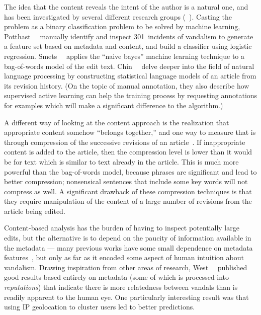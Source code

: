 The idea that the content reveals the intent of the author is a natural
one, and has been investigated by several different research groups
(\eg~\cite{Potthast2008,Smets2008,Druck2008,Itakura2009,Chin2010}).
Casting the problem as a binary classification problem to be solved by
machine learning, Potthast~\etal~\cite{Potthast2008} manually identify
and inspect 301~incidents of vandalism to generate a feature set based
on metadata and content, and build a classifier using
logistic regression.
Smets~\etal~\cite{Smets2008} applies the ``naive bayes'' machine
learning technique to a bag-of-words model of the edit text.
Chin~\etal~\cite{Chin2010} delve deeper into the field of
natural language processing by constructing statistical language
models of an article from its revision history.
(On the topic of manual annotation, they also describe how supervised
active learning can help the training process by requesting
annotations for examples which will make a significant difference to
the algorithm.)

A different way of looking at the content approach is the
realization that appropriate content somehow ``belongs together,'' and
one way to measure that is through compression of the successive
revisions of an article~\cite{Smets2008,Itakura2009}.
If inappropriate content is added to the article, then the compression
level is lower than it would be for text which is similar to text
already in the article.
This is much more powerful than the bag-of-words model, because
phrases are significant and lead to better compression; nonsensical
sentences that include some key words will not compress as well.
A significant drawback of these compression techniques is that they
require manipulation of the content of a large number of revisions
from the article being edited.

Content-based analysis has the burden of having to
inspect potentially large edits, but the alternative is to depend
on the paucity of information available in the metadata ---
many previous works have some small dependence on metadata
features~\cite{Potthast2008,Druck2008,Belani2010}, but only
as far as it encoded some aspect of human intuition about vandalism.
Drawing inspiration from other areas of research,
West~\etal~\cite{West2010} published good results
based entirely on metadata (some of which is processed into
\textit{reputations}) that indicate there is more relatedness between
vandals than is readily apparent to the human eye.
One particularly interesting result was that using IP geolocation
to cluster users led to better predictions.

